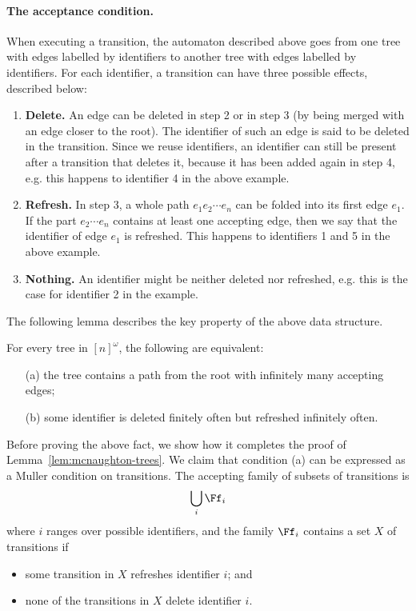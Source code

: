 \paragraph*{The acceptance condition.} When executing a transition, the automaton described above goes from one tree with edges labelled by identifiers to another tree with edges labelled by identifiers. For each identifier, a transition can have three possible effects, described below:
\begin{enumerate}
	\item {\bf Delete.} An edge can be deleted in  step 2  or in step 3 (by being  merged with an edge closer to the root). The identifier of such an edge is said to be deleted in the transition. Since we reuse identifiers, an identifier can still be present after a transition that deletes it, because it has been added again in step 4,  e.g. this happens to identifier 4 in the above example.
\item {\bf Refresh.} In step 3, a whole path $e_1 e_2 \cdots e_n$ can be folded into its first edge $e_1$. If the part $e_2 \cdots e_n$ contains at least one accepting edge, then we say that the identifier of edge $e_1$ is refreshed. This happens to identifiers 1 and 5 in the above example.
\item {\bf Nothing.} An identifier might be neither deleted nor refreshed, e.g. this is the case for identifier 2 in the example.
\end{enumerate}
The following lemma describes the key property of the above data structure.

\begin{lemma}\label{lem:muller-invariant}
For every tree in $[n]^\omega$, the following are equivalent:
\begin{enumerate}
	\item[(a)] the tree contains a path from the root with infinitely many accepting edges;
\item[(b)] some identifier is deleted finitely often but refreshed infinitely often.
\end{enumerate}
\end{lemma}
Before proving the above fact, we show how it completes the proof of Lemma~\ref{lem:mcnaughton-trees}. We claim that condition (a) can be expressed as a Muller condition on transitions. The accepting family of subsets of transitions is $$\bigcup_i \Ff_i$$ where $i$ ranges over possible identifiers, and the family $\Ff_i$ contains a set $X$ of transitions if
\begin{itemize}
	\item some transition in $X$ refreshes identifier $i$; and
	\item  none of the transitions in $X$ delete identifier $i$.
\end{itemize}


